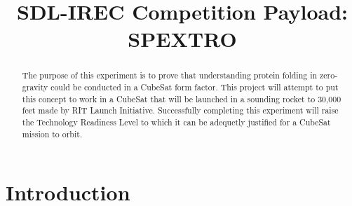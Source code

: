\documentclass[conference]{IEEEtran} %
\title{SDL-IREC Competition Payload: SPEXTRO}
\author{
  \IEEEauthorblockN{%
    James~Parkus\IEEEauthorrefmark{1},  %
  }
  \IEEEauthorblockA{%
    RIT Space Exploration, Rochester Institute of Technology \\ %
    Rochester, N.Y. \\
    Email:
    \IEEEauthorrefmark{1}jep7631@rit.edu
  }

}
\begin{document}
\maketitle%

\begin{abstract}
The purpose of this experiment is to prove that understanding protein folding in zero-gravity could be conducted in a CubeSat form factor. This project will attempt to put this 
concept to work in a CubeSat that will be launched in a sounding rocket to 30,000 feet made by RIT Launch Initiative. Successfully completing this experiment will raise the Technology 
Readiness Level to which it can be adequetly justified for a CubeSat mission to orbit.
\end{abstract}

\section{Introduction}
\label{sec:introduction}
\end{document}
